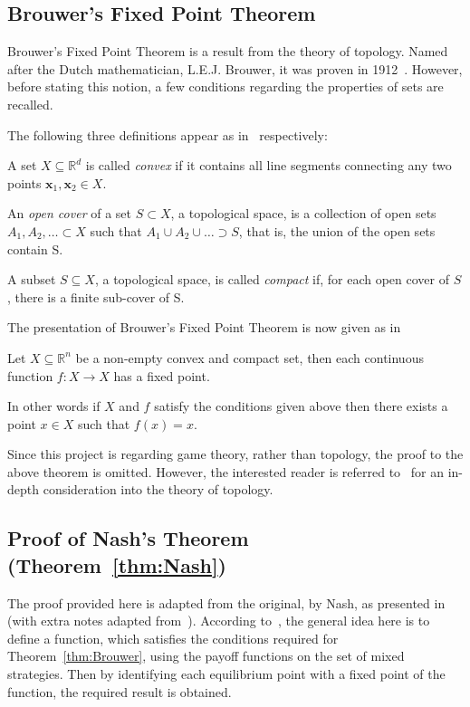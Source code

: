 \subsection{Brouwer's Fixed Point Theorem}\label{subsec:Brouwer_thm}
Brouwer's Fixed Point Theorem is a result from the theory of topology. Named
after the Dutch mathematician, L.E.J. Brouwer, it was proven in
1912~\cite{Carlson2016}. However, before stating this notion, a few conditions
regarding the properties of sets are recalled. 

The following three definitions appear as 
in~\cite{Weisstein, Barile, Weissteina} respectively:
\begin{definition}
    A set \(X \subseteq \mathbb{R}^{d}\) is called \textit{convex} if it
    contains all line segments connecting any two points \(\textbf{x}_{1},
    \textbf{x}_{2} \in X\).
\end{definition}

\begin{definition}
    An \textit{open cover} of a set \(S \subset X\), a topological space, is a
    collection of open sets \(A_{1}, A_{2}, \ldots \subset X\) such that
    \(A_{1} \cup A_{2} \cup \ldots \supset S\), that is, the union of the open
    sets contain S.
\end{definition}

\begin{definition}
    A subset \(S \subseteq X\), a topological space, is called \textit{compact}
    if, for each open cover of \(S\), there is a finite sub-cover of S.
\end{definition}

The presentation of Brouwer's Fixed Point Theorem is now given as 
in~\cite{maschler_solan_zamir_2013}
\begin{theorem}\label{thm:Brouwer}
    Let \(X \subseteq \mathbb{R}^{n}\) be a non-empty convex and compact
    set, then each continuous function \(f : X \to X\) has a fixed point.  
\end{theorem}
In other words if \(X\) and \(f\) satisfy the conditions given above then there
exists a point \(x \in X\) such that \(f(x) = x\). 

Since this project is regarding game theory, rather than topology, the proof to
the above theorem is omitted. However, the interested reader is referred
to~\cite{} for an in-depth consideration into the theory of topology.

\subsection{Proof of Nash's Theorem (Theorem~\ref{thm:Nash})}\label{subsec:Nash_Proof}
The proof provided here is adapted from the original, by Nash, as presented
in~\cite{nash1951non} (with extra notes adapted 
from~\cite{maschler_solan_zamir_2013}). According
to~\cite{maschler_solan_zamir_2013}, the general idea here is to define a
function, which satisfies the conditions required for Theorem~\ref{thm:Brouwer},
using the payoff functions on the set of mixed strategies. Then by identifying
each equilibrium point with a fixed point of the function, the required result 
is obtained.

